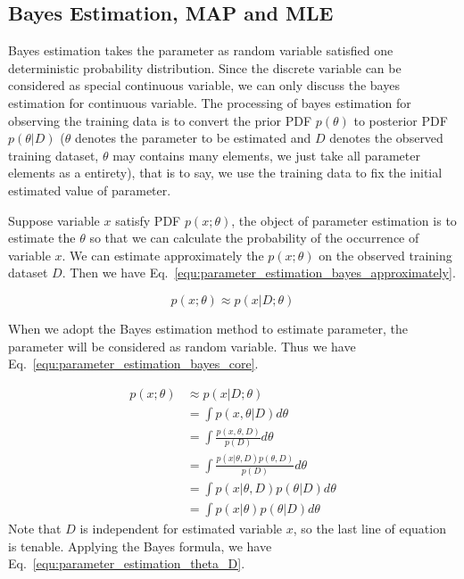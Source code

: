 \documentclass[runningheads,openany]{xhlPaper}
\begin{document}
\subsection{Bayes Estimation, MAP and MLE}
\label{sec:parameter_estimation_bayes_map_mle}
Bayes estimation takes the parameter as random variable satisfied one deterministic probability distribution. Since the discrete variable can be considered as special continuous variable, we can only discuss the bayes estimation for continuous variable. The processing of bayes estimation for observing the training data is to convert the prior PDF $p\left(\theta\right)$ to posterior PDF $p\left(\theta | D\right)$ ($\theta$ denotes the parameter to be estimated and $D$ denotes the observed training dataset, $\theta$ may contains many elements, we just take all parameter elements as a entirety), that is to say, we use the training data to fix the initial estimated value of parameter.

Suppose variable $x$ satisfy PDF $p\left( {x;\theta } \right)$, the object of parameter estimation is to estimate the $\theta$ so that we can calculate the probability of the occurrence of variable $x$.
We can estimate approximately the $p\left( {x;\theta } \right)$ on the observed training dataset $D$. Then we have Eq.~\ref{equ:parameter_estimation_bayes_approximately}.

\begin{equation}
\label{equ:parameter_estimation_bayes_approximately}
p\left( {x;\theta } \right) \approx p\left( {x|D;\theta } \right)
\end{equation}

When we adopt the Bayes estimation method to estimate parameter, the parameter will be considered as random variable. Thus we have Eq.~\ref{equ:parameter_estimation_bayes_core}.

\begin{equation}
\label{equ:parameter_estimation_bayes_core}
\begin{aligned}
p\left( {x;\theta } \right) &\approx p\left( {x|D;\theta } \right)\\
 &= \int {p\left( {x,\theta |D} \right)d\theta } \\
 &= \int {\frac{{p\left( {x,\theta ,D} \right)}}{{p\left( D \right)}}d\theta } \\
 &= \int {\frac{{p\left( {x|\theta ,D} \right)p\left( {\theta ,D} \right)}}{{p\left( D \right)}}d\theta } \\
 &= \int {p\left( {x|\theta ,D} \right)p\left( {\theta |D} \right)d\theta }\\ 
 &= \int {p\left( {x|\theta } \right)p\left( {\theta |D} \right)d\theta }
\end{aligned}
\end{equation}
Note that $D$ is independent for estimated variable $x$, so the last line of equation is tenable.
Applying the Bayes formula, we have Eq.~\ref{equ:parameter_estimation_theta_D}.
\end{document}
